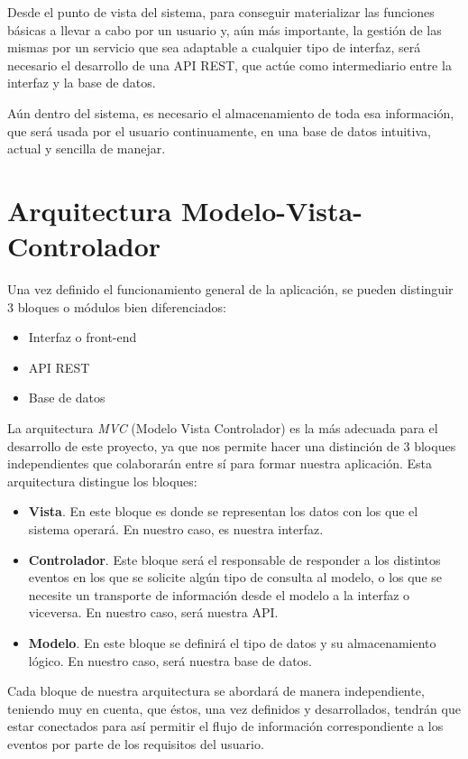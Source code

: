 Desde el punto de vista del sistema, para conseguir materializar las funciones básicas a llevar a cabo por un usuario y, aún más importante, la gestión de las mismas por un servicio que sea adaptable a cualquier tipo de interfaz, será necesario el desarrollo de una API REST, que actúe como intermediario entre la interfaz y la base de datos.

Aún dentro del sistema, es necesario el almacenamiento de toda esa información, que será usada por el usuario continuamente, en una base de datos intuitiva, actual y sencilla de manejar.


\section{Arquitectura Modelo-Vista-Controlador}

Una vez definido el funcionamiento general de la aplicación, se pueden distinguir 3 bloques o módulos bien diferenciados:

\begin{itemize}
    \item Interfaz o front-end
    \item API REST
    \item Base de datos
\end{itemize}
 
 La arquitectura \textit{MVC} (Modelo Vista Controlador) es la más adecuada para el desarrollo de este proyecto, ya que nos permite hacer una distinción de 3 bloques independientes que colaborarán entre sí para formar nuestra aplicación\cite{mvc2}\cite{mvc3}. Esta arquitectura distingue los bloques\cite{mvc1}:
 
 \begin{itemize}
    \item \textbf{Vista}. En este bloque es donde se representan los datos con los que el sistema operará. En nuestro caso, es nuestra interfaz.
    \item \textbf{Controlador}. Este bloque será el responsable de responder a los distintos eventos en los que se solicite algún tipo de consulta al modelo, o los que se necesite un transporte de información desde el modelo a la interfaz o viceversa. En nuestro caso, será nuestra API.
    \item \textbf{Modelo}. En este bloque se definirá el tipo de datos y su almacenamiento lógico. En nuestro caso, será nuestra base de datos.
\end{itemize}

Cada bloque de nuestra arquitectura se abordará de manera independiente, teniendo muy en cuenta, que éstos, una vez definidos y desarrollados, tendrán que estar conectados para así permitir el flujo de información correspondiente a los eventos por parte de los requisitos del usuario. 

